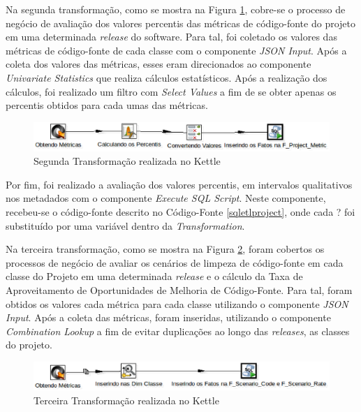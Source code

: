 \begin{apendicesenv}
Na segunda transformação, como se mostra na Figura \ref{fig:secondtransformation}, cobre-se o processo de negócio de avaliação dos valores percentis das métricas de código-fonte do projeto em uma determinada \textit{release} do software. Para tal, foi coletado os valores das métricas de código-fonte de cada classe com o componente \textit{JSON Input}. Após a coleta dos valores das métricas, esses eram direcionados ao componente \textit{Univariate Statistics} que realiza cálculos estatísticos. Após a realização dos cálculos, foi realizado um filtro com \textit{Select Values} a fim de se obter apenas os percentis obtidos para cada umas das métricas. 

\begin{figure}[h!]
\centering
\includegraphics[keepaspectratio=false,scale=0.65]{figuras/figuras_nilton/secondtransformation.eps}
\caption{Segunda Transformação realizada no Kettle}
\label{fig:secondtransformation}
\end{figure}
\FloatBarrier

Por fim, foi realizado a avaliação dos valores percentis, em intervalos qualitativos nos metadados com o componente \textit{Execute SQL Script}. Neste componente, recebeu-se o código-fonte descrito no Código-Fonte \ref{sqletlproject}, onde cada ? foi substituído por uma variável dentro da \textit{Transformation}.




Na terceira transformação, como se mostra na Figura \ref{fig:thirdtransformation}, foram cobertos os processos de negócio de avaliar os cenários de limpeza de código-fonte em cada classe do Projeto em uma determinada \textit{release} e o cálculo da Taxa de Aproveitamento de Oportunidades de Melhoria de Código-Fonte. Para tal, foram obtidos os valores cada métrica para cada classe utilizando o componente \textit{JSON Input}. Após a coleta das métricas, foram inseridas, utilizando o componente \textit{Combination Lookup} a fim de evitar duplicações ao longo das \textit{releases}, as classes do projeto.

\begin{figure}[h!]
\centering
\includegraphics[keepaspectratio=false,scale=0.65]{figuras/figuras_nilton/thirdtransformation.eps}
\caption{Terceira Transformação realizada no Kettle}
\label{fig:thirdtransformation}
\end{figure}
\FloatBarrier


\end{apendicesenv}
